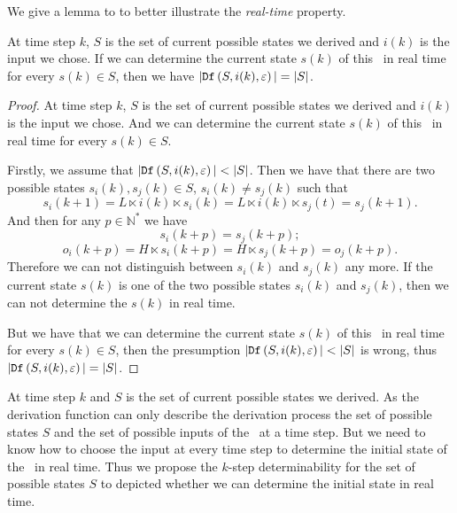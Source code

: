  We give a lemma to to better illustrate the {\em real-time} property.
\begin{lemma}
 At time step $k$, $S$ is the set of current possible states we derived and $i(k)$ is the input we chose. If we can determine the current state $s(k)$ of this \BCN\ in real time for every $s(k)\in S$, then we have 
 $|{\tt Df}\left(S,i(k),\varepsilon\right)|=|S|$.
 \label{lemm:1}
\end{lemma}

\begin{proof}
At time step $k$, $S$ is the set of current possible states we derived and $i(k)$ is the input we chose. And we can determine the current state $s(k)$ of this \BCN\ in real time for every $s(k)\in S$. 

Firstly, we assume that $|\Ded\left(S,i(k),\varepsilon\right)|<|S|$. Then we have that there are two possible states $s_i(k), s_j(k)\in S$, $s_i(k)\neq s_j(k)$ such that 
\[s_i(k+1)=L\ltimes i(k)\ltimes s_i(k)=L\ltimes i(k)\ltimes s_j(t)=s_j(k+1).\]
And then for any $p\in \mathbb{N}^*$ we have 
\[s_i(k+p)=s_j(k+p);\]
\[o_i(k+p)= H\ltimes{s_i(k+p)}= H\ltimes{s_j(k+p)}=o_j(k+p).\]
 Therefore we can not distinguish between $s_i(k)$ and $s_j(k)$ any more.
 If the current state $s(k)$ is one of the two possible states $s_i(k)$ and $s_j(k)$, then we can not determine the $s(k)$ in real time. 
 
 But we have that we can determine the current state $s(k)$ of this \BCN\ in real time for every $s(k)\in S$, then the presumption $|\Ded\left(S,i(k),\varepsilon\right)|<|S|$ is wrong, thus $|{\tt Df}\left(S,i(k),\varepsilon\right)|=|S|$.
\end{proof}
 

 At time step $k$ and $S$ is the set of current possible states we derived. As the derivation function can only describe the derivation process the set of possible states $S$ and the set of possible inputs of the \BCN\ at a time step. But we need to know how to choose the input at every time step to determine the initial state of the \BCN\ in real time. Thus we propose the $k$-step determinability for the set of possible states $S$ to depicted whether we can determine the initial state in real time.
